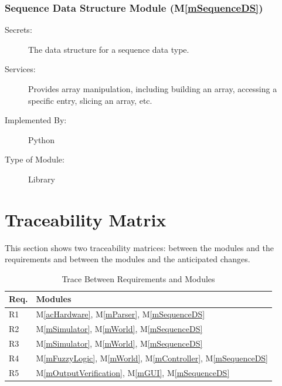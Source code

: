 \documentclass[12pt, titlepage]{article}
\newcommand{\mref}[1]{M\ref{#1}}
\begin{document}
\subsubsection{Sequence Data Structure Module (\mref{mSequenceDS})}

\begin{description}
\item[Secrets:]  The data structure for a sequence data type.
\item[Services:] Provides array manipulation, including building an array, 
                 accessing a specific entry, slicing an array, etc.
\item[Implemented By:] Python
\item[Type of Module:] Library
\end{description}


\section{Traceability Matrix} \label{SecTM}

This section shows two traceability matrices: between the modules and the
requirements and between the modules and the anticipated changes.

\begin{table}[H]
\centering
\begin{tabular}{p{} p{}}
\toprule
\textbf{Req.} & \textbf{Modules}\\
\midrule
R1 & \mref{acHardware}, \mref{mParser}, \mref{mSequenceDS}\\
R2 & \mref{mSimulator}, \mref{mWorld}, \mref{mSequenceDS}\\
R3 & \mref{mSimulator}, \mref{mWorld}, \mref{mSequenceDS}\\
R4 & \mref{mFuzzyLogic}, \mref{mWorld}, \mref{mController}, \mref{mSequenceDS}\\
R5 & \mref{mOutputVerification}, \mref{mGUI}, \mref{mSequenceDS}\\
\bottomrule
\end{tabular}
\caption{Trace Between Requirements and Modules}
\label{TblRT}
\end{table}
\end{document}
